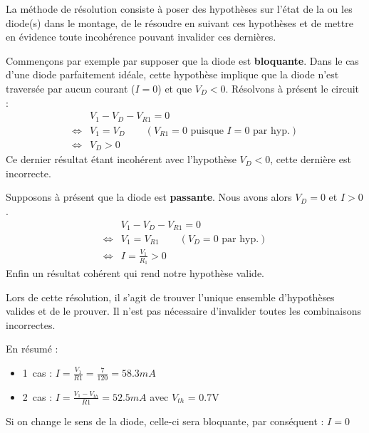 \documentclass{../../template/tp}
\begin{document}
{%
La méthode de résolution consiste à poser des hypothèses sur l'état de la ou les diode(s) dans le montage, de le résoudre en suivant ces hypothèses et de mettre en évidence toute incohérence pouvant invalider ces dernières.

Commençons par exemple par supposer que la diode est \textbf{bloquante}.
Dans le cas d'une diode parfaitement idéale, cette hypothèse implique que la diode n'est traversée par aucun courant ($I = 0$) et que $V_D < 0$.
Résolvons à présent le circuit :
\begin{align*}
    &V_1 - V_D - V_{R1} = 0 \\
    \Leftrightarrow &V_1 = V_D \quad\quad  (V_{R1} = 0 \mbox{ puisque }I = 0 \mbox{ par hyp.}) \\
    \Leftrightarrow &V_D > 0
\end{align*}
Ce dernier résultat étant incohérent avec l'hypothèse $V_D < 0$, cette dernière est incorrecte.

Supposons à présent que la diode est \textbf{passante}.
Nous avons alors $V_D = 0$ et $I > 0$.
\begin{align*}
    &V_1 - V_D - V_{R1} = 0 \\
    \Leftrightarrow &V_1 = V_{R1} \quad\quad  (V_D = 0 \mbox{ par hyp.}) \\
    \Leftrightarrow &I = \frac{V_1}{R_1} > 0
\end{align*}
Enfin un résultat cohérent qui rend notre hypothèse valide.

Lors de cette résolution, il s'agit de trouver l'unique ensemble d'hypothèses valides et de le prouver. Il n'est pas nécessaire d'invalider toutes les combinaisons incorrectes.

En résumé :
\begin{itemize}
    \item 1\ier~cas : $I = \frac{V_1}{R1} = \frac{7}{120} = 58.3mA$
    \item 2\ieme~cas : $I = \frac{V_1-V_{th}}{R1} = 52.5mA$ avec $V_{th}$ = 0.7V
\end{itemize}
Si on change le sens de la diode, celle-ci sera bloquante, par conséquent : $I=0$

}
\end{document}
